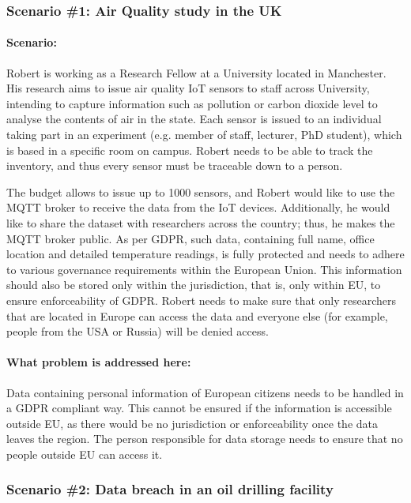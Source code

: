 \subsubsection{Scenario \#1: Air Quality study in the UK}
\paragraph{\textbf{Scenario:}}
Robert is working as a Research Fellow at a University located in Manchester. His research aims to issue air quality IoT sensors to staff across University, intending to capture information such as pollution or carbon dioxide level to analyse the contents of air in the state. Each sensor is issued to an individual taking part in an experiment (e.g. member of staff, lecturer, PhD student), which is based in a specific room on campus. Robert needs to be able to track the inventory, and thus every sensor must be traceable down to a person.

The budget allows to issue up to 1000 sensors, and Robert would like to use the MQTT broker to receive the data from the IoT devices. Additionally, he would like to share the dataset with researchers across the country; thus, he makes the MQTT broker public. As per GDPR, such data, containing full name, office location and detailed temperature readings, is fully protected and needs to adhere to various governance requirements within the European Union. This information should also be stored only within the jurisdiction, that is, only within EU, to ensure enforceability of GDPR. Robert needs to make sure that only researchers that are located in Europe can access the data and everyone else (for example, people from the USA or Russia) will be denied access.

\paragraph{\textbf{What problem is addressed here:}}
Data containing personal information of European citizens needs to be handled in a GDPR compliant way. This cannot be ensured if the information is accessible outside EU, as there would be no jurisdiction or enforceability once the data leaves the region. The person responsible for data storage needs to ensure that no people outside EU can access it.
\\
\subsubsection{Scenario \#2: Data breach in an oil drilling facility}
